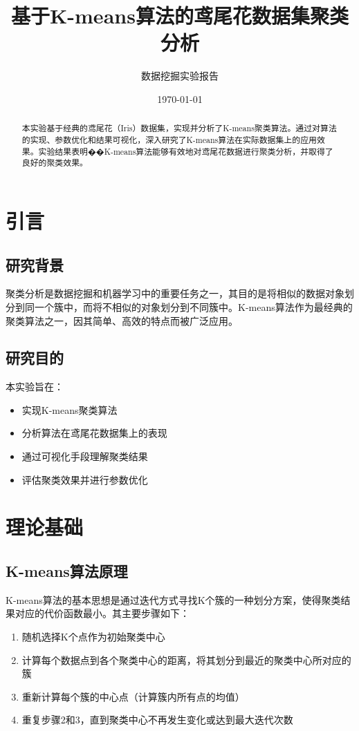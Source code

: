 \documentclass[12pt, a4paper]{article}
\title{基于K-means算法的鸢尾花数据集聚类分析}
\author{数据挖掘实验报告}
\date{\today}
\begin{document}
\maketitle

\begin{abstract}
本实验基于经典的鸢尾花（Iris）数据集，实现并分析了K-means聚类算法。通过对算法的实现、参数优化和结果可视化，深入研究了K-means算法在实际数据集上的应用效果。实验结果表明��K-means算法能够有效地对鸢尾花数据进行聚类分析，并取得了良好的聚类效果。
\end{abstract}

\tableofcontents

\section{引言}
\subsection{研究背景}
聚类分析是数据挖掘和机器学习中的重要任务之一，其目的是将相似的数据对象划分到同一个簇中，而将不相似的对象划分到不同簇中。K-means算法作为最经典的聚类算法之一，因其简单、高效的特点而被广泛应用。

\subsection{研究目的}
本实验旨在：
\begin{itemize}
    \item 实现K-means聚类算法
    \item 分析算法在鸢尾花数据集上的表现
    \item 通过可视化手段理解聚类结果
    \item 评估聚类效果并进行参数优化
\end{itemize}

\section{理论基础}
\subsection{K-means算法原理}
K-means算法的基本思想是通过迭代方式寻找K个簇的一种划分方案，使得聚类结果对应的代价函数最小。其主要步骤如下：

\begin{enumerate}
    \item 随机选择K个点作为初始聚类中心
    \item 计算每个数据点到各个聚类中心的距离，将其划分到最近的聚类中心所对应的簇
    \item 重新计算每个簇的中心点（计算簇内所有点的均值）
    \item 重复步骤2和3，直到聚类中心不再发生变化或达到最大迭代次数
\end{enumerate}
\end{document}
